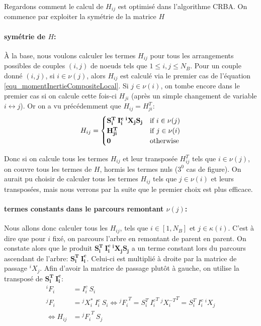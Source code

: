 \documentclass{report}
\begin{document}
Regardons comment le calcul de $H_{ij}$ est optimisé dans l'algorithme CRBA. On commence par exploiter la symétrie de la matrice $H$

\paragraph{symétrie de $H$:}
À la base, nous voulons calculer les termes $H_{ij}$ pour tous les arrangements possibles de couples $(i,j)$ de noeuds tels que $1 \leqslant i,j \leqslant N_B$. Pour un couple donné $(i,j)$, si $i \in \nu(j)$, alors $H_{ij}$ est calculé via le premier cas de l'équation \eqref{equ_momentInertieCompositeLocal}. Si $j \in \nu(i)$, on tombe encore dans le premier cas si on calcule cette fois-ci $H_{ji}$ (après un simple changement de variable $i \leftrightarrow j$). Or on a vu précédemment que $H_{ij}={H_{ji}^T}$:
\begin{equation}
H_{ij} = 
\begin{cases}
\mathbf{{S_i^T} \: {I_i^c} \: {^iX_j} S_j} & \textnormal{if } i \in \nu(j) \\
\mathbf{H_{ji}^T} & \textnormal{if } j \in \nu(i) \\
\mathbf{0} & \textnormal{otherwise}
\end{cases} \label{equ_momentInertieCompositeLocal2}
\end{equation}
\begin{flushleft}
Donc si on calcule tous les termes $H_{ij}$ et leur transposée $H_{ij}^T$ tels que $i \in \nu(j)$, on couvre tous les termes de $H$, hormis les termes nuls ($3^0$ cas de figure). On aurait pu choisir de calculer tous les termes $H_{ij}$ tels que $j \in \nu(i)$ et leurs transposées, mais nous verrons par la suite que le premier choix est plus efficace.
\end{flushleft}

\paragraph{termes constants dans le parcours remontant $\nu(j)$:}
Nous allons donc calculer tous les $H_{ij}$, tels que $i \in [1,N_B]$ et $j \in \kappa(i)$. C'est à dire que pour $i$ fixé, on parcours l'arbre en remontant de parent en parent. On constate alors que le produit $\mathbf{{S_i^T} \: {I_i^c} \: {^iX_j} S_j}$ a un terme constant lors du parcours ascendant de l'arbre: $\mathbf{{S_i^T} \: {I_i^c}}$. Celui-ci est multiplié à droite par la matrice de passage $^iX_j$. Afin d'avoir la matrice de passage plutôt à gauche, on utilise la transposé de $\mathbf{{S_i^T} \: {I_i^c}}$:
\begin{align}
{^iF_i} &= {I_i^c} \: S_i \\
{^jF_i} &= {^jX_i^*} \: {I_i^c} \: S_i \iff {^jF_i}^T = {S_i^T} \: {I_i^c}^T \: {^jX_i^{-T}}^T = {S_i^T} \: {I_i^c} \: {^iX_j} \\
\iff H_{ij} &= {^jF_i}^T \: S_j
\end{align}
\end{document}
